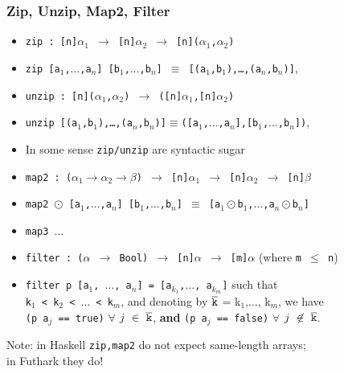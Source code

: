 \documentclass{beamer}
\renewcommand{\emph}[1]{\textcolor{structure}{#1}}
\newcommand{\emp}[1]{\textcolor{DikuRed}{ #1}}
\begin{document}
\begin{frame}[fragile,t]
  \frametitle{Zip, Unzip, Map2, Filter}

\begin{itemize}
    \item \emph{\tt zip : [n]$\alpha_1$ $\rightarrow$ [n]$\alpha_2$ $\rightarrow$ [n]($\alpha_1$,$\alpha_2$)}
    \item \emp{\tt zip [a$_1$,$\ldots$,a$_n$] [b$_1$,$\ldots$,b$_n$] $\equiv$ [(a$_1$,b$_1$),\ldots,(a$_n$,b$_n$)]},\pause
    \item \emph{\tt unzip : [n]($\alpha_1$,$\alpha_2$) $\rightarrow$ ([n]$\alpha_1$,[n]$\alpha_2$)}
    \item \emp{\tt unzip [(a$_1$,b$_1$),\ldots,(a$_n$,b$_n$)]$\equiv$([a$_1$,$\ldots$,a$_n$],[b$_1$,$\ldots$,b$_n$])},
    \item In some sense {\tt zip/unzip} are syntactic sugar

    \item {\tt map2 : ($\alpha_1\rightarrow\alpha_2\rightarrow\beta$) $\rightarrow$ [n]$\alpha_1$ $\rightarrow$ [n]$\alpha_2$ $\rightarrow$ [n]$\beta$}
    \item {\tt map2 $\odot$ [a$_1$,$\ldots$,a$_n$] [b$_1$,$\ldots$,b$_n$] $\equiv$ [a$_1\odot$b$_1$,$\ldots$,a$_n\odot$b$_n$]}
    \item {\tt map3 $\ldots$}\medskip\pause

    \item {\tt filter : ($\alpha$ $\to$ Bool) $\to$ [n]$\alpha$ $\to$ [m]$\alpha$}   (where {\tt m $\leq$ n})
    \item {\tt filter p [a$_1$, $\ldots$, a$_n$] = [a$_{k_1}$,$\ldots$, a$_{k_m}$]} such that\\
        {\tt k$_1$ < k$_2$ < $\ldots$ < k$_m$}, and denoting by $\overline{\mbox{\tt k}}$ = {k$_1$,$\ldots$, k$_m$}, we have\\
        {\tt(p a$_j$ == true)} $\forall$ $j~\in~\overline{\mbox{\tt k}}$, \textbf{and} {\tt(p a$_j$ == false)} $\forall$ $j~\not\in~\overline{\mbox{\tt k}}$.\medskip
\end  {itemize}

Note: in Haskell {\tt zip,map2} do not expect same-length arrays;\\ in Futhark they do!

\end{frame}
\end{document}
